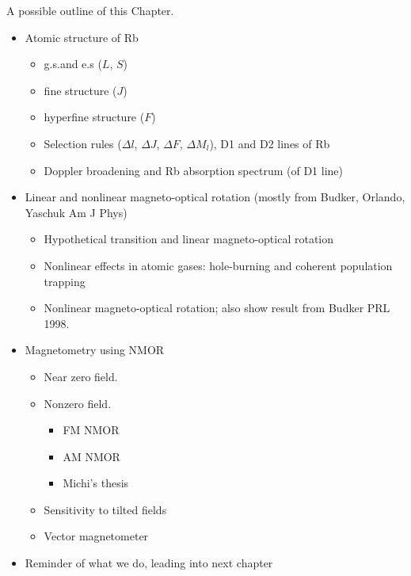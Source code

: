 A possible outline of this Chapter.
\begin{itemize}
\item Atomic structure of Rb

  \begin{itemize}
  \item g.s.and e.s ($L$, $S$)
  
  
  \item fine structure ($J$)
  
  \item hyperfine structure ($F$)
  
  
  \item Selection rules ($\Delta l$, $\Delta J$, $\Delta F$, $\Delta
    M_l$), D1 and D2 lines of Rb
    
  
  \item Doppler broadening and Rb absorption spectrum (of D1 line)
  \end{itemize}
\item Linear and nonlinear magneto-optical rotation (mostly from
  Budker, Orlando, Yaschuk Am J Phys)
  \begin{itemize}
  \item Hypothetical transition and linear magneto-optical rotation
   \item Nonlinear effects in atomic gases: hole-burning and coherent
    population trapping
 
  \item Nonlinear magneto-optical rotation; also show result from
    Budker PRL 1998.
  \end{itemize}
\item Magnetometry using NMOR


  \begin{itemize}
    \item Near zero field.
    \item Nonzero field.
      \begin{itemize}
      \item FM NMOR 
      
     
      \item AM NMOR
       

      
      \item Michi's thesis

 
      \end{itemize}
    \item Sensitivity to tilted fields
    
    
    \item Vector magnetometer
    
    
  \end{itemize}
\item Reminder of what we do, leading into next chapter
\end{itemize}


